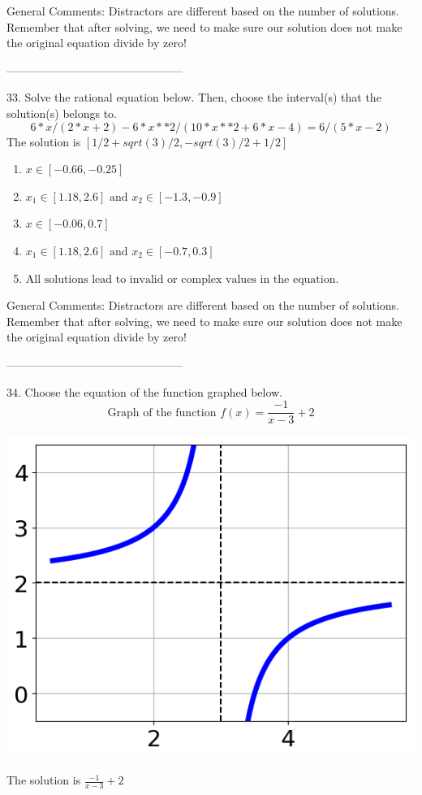 \documentclass{article}[10pt]
\begin{document}
General Comments: Distractors are different based on the number of solutions. Remember that after solving, we need to make sure our solution does not make the original equation divide by zero!

-----------------------------------------------

33. Solve the rational equation below. Then, choose the interval(s) that the solution(s) belongs to.
$$ 6*x/(2*x + 2) - 6*x**2/(10*x**2 + 6*x - 4) = 6/(5*x - 2) $$ 
The solution is $ [1/2 + sqrt(3)/2, -sqrt(3)/2 + 1/2] $ 

\begin{enumerate}[label=\Alph*.] 
\item $ x \in [-0.66,-0.25] $ 

  
\item $ x_1 \in [1.18, 2.6] \text{ and } x_2 \in [-1.3,-0.9] $ 

  
\item $ x \in [-0.06,0.7] $ 

  
\item $ x_1 \in [1.18, 2.6] \text{ and } x_2 \in [-0.7,0.3] $ 

  
\item $ \text{All solutions lead to invalid or complex values in the equation.} $ 

  
\end{enumerate} 
 
General Comments: Distractors are different based on the number of solutions. Remember that after solving, we need to make sure our solution does not make the original equation divide by zero!

-----------------------------------------------

34. Choose the equation of the function graphed below.
$$ \text{Graph of the function } f(x) = \frac{-1}{x - 3} + 2 $$ 
\begin{center}\includegraphics[scale=0.5]{../Figures/question34C.png}\end{center}The solution is $ \frac{-1}{x - 3} + 2 $ 
\end{document}

